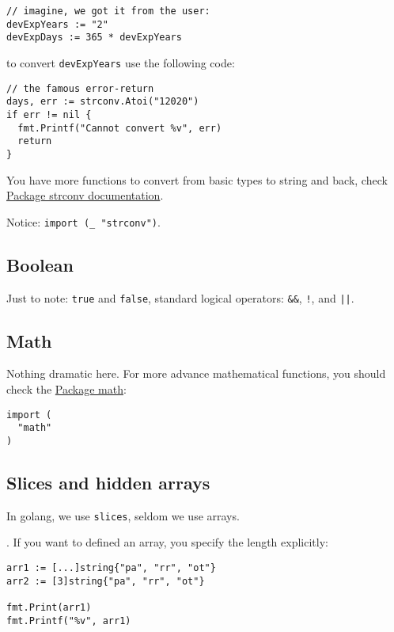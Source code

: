 \documentclass[11pt, letterpaper]{article}
\begin{document}
\begin{verbatim}
// imagine, we got it from the user:
devExpYears := "2"
devExpDays := 365 * devExpYears
\end{verbatim}

to convert \texttt{devExpYears} use the following code:

\begin{verbatim}
// the famous error-return
days, err := strconv.Atoi("12020")
if err != nil {
  fmt.Printf("Cannot convert %v", err)
  return
}
\end{verbatim}

You have more functions to convert from basic types to string and back, check \href{https://golang.org/pkg/strconv}{Package strconv documentation}.

Notice: \texttt{import (_ "strconv")}.

\subsection{Boolean}

Just to note: \texttt{true} and \texttt{false}, standard logical operators: \texttt{&&}, \texttt{!}, and \texttt{||}.

\subsection{Math}
Nothing dramatic here. For more advance mathematical functions, you should check the \href{https://golang.org/pkg/math}{Package math}:
\begin{verbatim}
import (
  "math"
)
\end{verbatim}

\subsection{Slices and hidden arrays}
In golang, we use \verb|slices|, seldom we use arrays.

. If you want to defined an array, you specify the length explicitly:

\begin{verbatim}
arr1 := [...]string{"pa", "rr", "ot"}
arr2 := [3]string{"pa", "rr", "ot"}

fmt.Print(arr1)
fmt.Printf("%v", arr1)
\end{verbatim}
\end{document}
